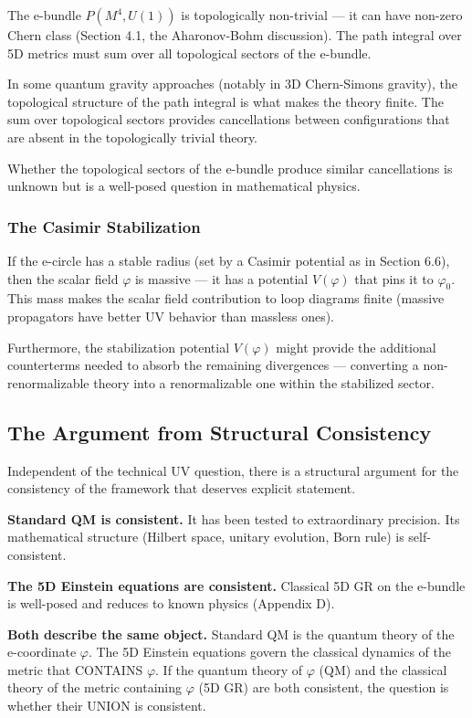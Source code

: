 \documentclass[aps,prd,preprint,superscriptaddress,longbibliography,floatfix]{revtex4-2}
\theoremstyle{remark}
\begin{document}
The e-bundle $P(M^{4}, U(1))$ is topologically non-trivial --- it can have non-zero Chern class (Section 4.1, the Aharonov-Bohm discussion). The path integral over 5D metrics must sum over all topological sectors of the e-bundle.

In some quantum gravity approaches (notably in 3D Chern-Simons gravity), the topological structure of the path integral is what makes the theory finite. The sum over topological sectors provides cancellations between configurations that are absent in the topologically trivial theory.

Whether the topological sectors of the e-bundle produce similar cancellations is unknown but is a well-posed question in mathematical physics.


\subsubsection{The Casimir Stabilization}

If the e-circle has a stable radius (set by a Casimir potential as in Section 6.6), then the scalar field $\varphi$ is massive --- it has a potential $V(\varphi)$ that pins it to $\varphi_{0}$. This mass makes the scalar field contribution to loop diagrams finite (massive propagators have better UV behavior than massless ones).

Furthermore, the stabilization potential $V(\varphi)$ might provide the additional counterterms needed to absorb the remaining divergences --- converting a non-renormalizable theory into a renormalizable one within the stabilized sector.



\subsection{The Argument from Structural Consistency}

Independent of the technical UV question, there is a structural argument for the consistency of the framework that deserves explicit statement.

\textbf{Standard QM is consistent.} It has been tested to extraordinary precision. Its mathematical structure (Hilbert space, unitary evolution, Born rule) is self-consistent.

\textbf{The 5D Einstein equations are consistent.} Classical 5D GR on the e-bundle is well-posed and reduces to known physics (Appendix D).

\textbf{Both describe the same object.} Standard QM is the quantum theory of the e-coordinate $\varphi$. The 5D Einstein equations govern the classical dynamics of the metric that CONTAINS $\varphi$. If the quantum theory of $\varphi$ (QM) and the classical theory of the metric containing $\varphi$ (5D GR) are both consistent, the question is whether their UNION is consistent.
\end{document}
